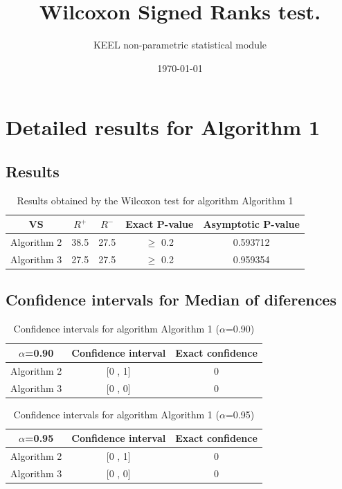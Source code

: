 \documentclass[a4paper,10pt]{article}
\title{Wilcoxon Signed Ranks test.}
\date{\today}
\author{KEEL non-parametric statistical module}
\begin{document}
\pagestyle{empty}
\maketitle
\thispagestyle{empty}



\section{Detailed results for Algorithm 1}


\subsection{Results}

\begin{table}[!htp]
\centering\small
\begin{tabular}{
|c|c|c|c|c|}
\hline
 VS & $R^{+}$ & $R^{-}$ & Exact P-value & Asymptotic P-value \\ \hline 
Algorithm 2 & 38.5 & 27.5 & $\geq$ 0.2 & 0.593712\\ \hline 
Algorithm 3 & 27.5 & 27.5 & $\geq$ 0.2 & 0.959354\\ \hline 

\end{tabular}
\caption{Results obtained by the Wilcoxon test for algorithm Algorithm 1}
\end{table}

\subsection{Confidence intervals for Median of diferences}

\begin{table}[!htp]
\centering\small
\begin{tabular}{
|c|c|c|}
\hline
 $\alpha$=0.90 & Confidence interval & Exact confidence \\ \hline 
Algorithm 2 & [0 , 1] & 0\\ \hline 
Algorithm 3 & [0 , 0] & 0\\ \hline 

\end{tabular}
\caption{Confidence intervals for algorithm Algorithm 1 ($\alpha$=0.90)}
\end{table}
\begin{table}[!htp]
\centering\small
\begin{tabular}{
|c|c|c|}
\hline
 $\alpha$=0.95 & Confidence interval & Exact confidence \\ \hline 
Algorithm 2 & [0 , 1] & 0\\ \hline 
Algorithm 3 & [0 , 0] & 0\\ \hline 

\end{tabular}
\caption{Confidence intervals for algorithm Algorithm 1 ($\alpha$=0.95)}
\end{table}
\end{document}
